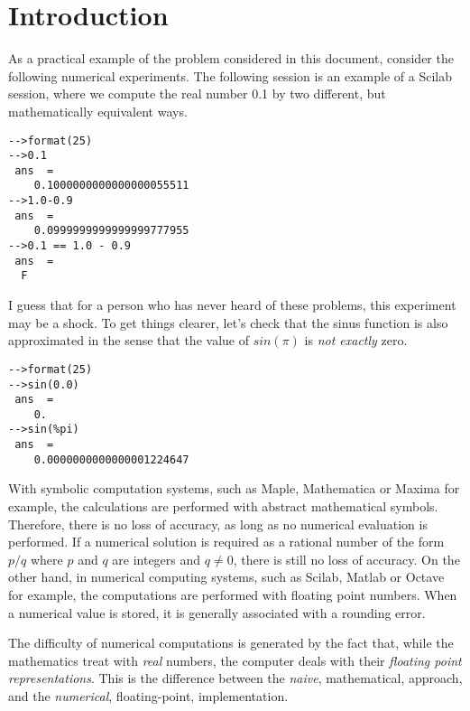 %

\section{Introduction}

As a practical example of the problem considered in this
document, consider the following numerical experiments. 
The following session is an example of 
a Scilab session, where we compute the real number 0.1 by two different, 
but mathematically equivalent ways.
\lstset{language=scilabscript}
\begin{lstlisting}
-->format(25)
-->0.1
 ans  =
    0.1000000000000000055511  
-->1.0-0.9
 ans  =
    0.0999999999999999777955  
-->0.1 == 1.0 - 0.9
 ans  =
  F  
\end{lstlisting}

I guess that for a person who has never heard of these problems,
this experiment may be a shock. To get things clearer, let's 
check that the sinus function is also approximated in the sense that 
the value of $sin(\pi)$ is \emph{not exactly} zero.
\lstset{language=scilabscript}
\begin{lstlisting}
-->format(25)
-->sin(0.0)
 ans  =
    0.  
-->sin(%pi)
 ans  =
    0.0000000000000001224647  
\end{lstlisting}

With symbolic computation systems, such as Maple\cite{WWWMapleSoft}, 
Mathematica\cite{WWWMathematica} or Maxima\cite{WWWMaxima} for example, 
the calculations are performed with abstract mathematical 
symbols. Therefore, there is no loss of accuracy, as long as 
no numerical evaluation is performed. If a numerical solution is 
required as a rational number of the form $p/q$ where $p$ and $q$ are 
integers and $q\neq 0$, there is still no loss of accuracy.
On the other hand, in numerical computing systems, such as 
Scilab\cite{WWWScilab}, Matlab\cite{WWWMatlab} or Octave\cite{WWWOctave} for example, 
the computations are performed with floating point numbers.
When a numerical value is stored, it is generally associated with a 
rounding error. 

The difficulty of numerical computations is generated by the fact that, while 
the mathematics treat with \emph{real} numbers, the 
computer deals with their \emph{floating point representations}.
This is the difference between the 
\emph{naive}, mathematical, approach, and the \emph{numerical},
floating-point, implementation.

